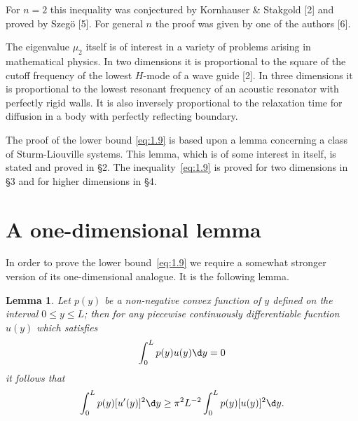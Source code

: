 \documentclass{article}
\newtheorem*{lemma}{Lemma}
\theoremstyle{remarks}
\begin{document}
For $n=2$ this inequality was conjectured by Kornhauser \& Stakgold [2]
and proved by Szeg\"o [5]. For general $n$ the proof was given by one of
the authors [6].

The eigenvalue $\mu_2$ itself is of interest in a variety of problems arising
in mathematical physics.
In two dimensions it is proportional to the square of the cutoff frequency
of the lowest $H$-mode of a wave guide [2].
In three dimensions it is proportional to the lowest resonant frequency
of an acoustic resonator with perfectly rigid walls.
It is also inversely proportional to the relaxation time for diffusion
in a body with perfectly reflecting boundary.

The proof of the lower bound \eqref{eq:1.9} is based upon a lemma
concerning a class of Sturm-Liouville systems.
This lemma, which is of some interest in itself, is stated and proved in \S2.
The inequality~\eqref{eq:1.9} is proved for two dimensions in \S3 and for
higher dimensions in \S4.


\section{A one-dimensional lemma}

In order to prove the lower bound~\eqref{eq:1.9} we require a somewhat stronger
version of its one-dimensional analogue. It is the following lemma.

\begin{lemma}
  Let $p(y)$ be a non-negative convex function of $y$ defined on
  the interval $0\leq y\leq L$; then for any piecewise continuously
  differentiable fucntion $u(y)$ which satisfies
  \begin{equation}\label{eq:2.1}
    \int_0^L p(y)u(y) \d y = 0
  \end{equation}
  it follows that
  \begin{equation}\label{eq:2.2}
    \int_0^L p(y) [u'(y)]^2 \d y \geq \pi^2L^{-2} \int_0^L p(y) [u(y)]^2 \d y.
  \end{equation}
\end{lemma}
\end{document}
